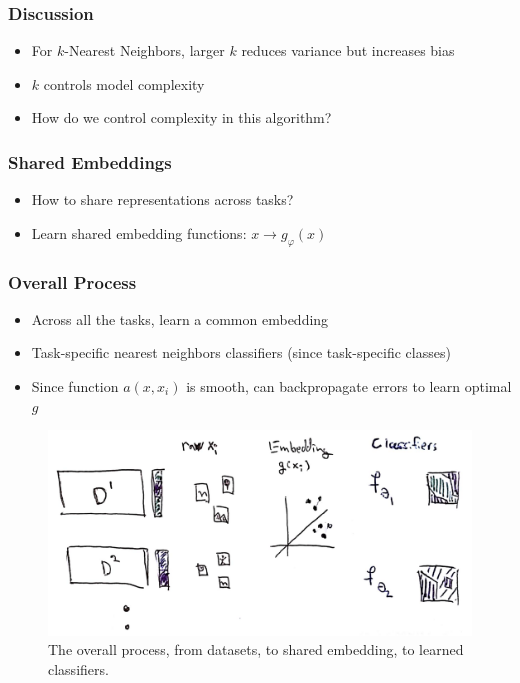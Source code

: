 \documentclass[10pt,mathserif]{beamer}
\begin{document}
\begin{frame}
  \frametitle{Discussion}
  \begin{itemize}
  \item For $k$-Nearest Neighbors, larger $k$ reduces variance but increases bias
  \item $k$ controls model complexity
  \item How do we control complexity in this algorithm?
  \end{itemize} 
\end{frame}

\begin{frame}
  \frametitle{Shared Embeddings}
 \begin{itemize}
 \item How to share representations across tasks? 
 \item Learn shared embedding functions: $x \rightarrow g_\varphi\left(x\right)$
 \end{itemize} 
\end{frame}

\begin{frame}
  \frametitle{Overall Process}
 \begin{itemize}
 \item  Across all the tasks, learn a common embedding
 \item Task-specific nearest neighbors classifiers (since task-specific classes)
 \item Since function $a\left(x, x_i\right)$ is smooth, can backpropagate errors
   to learn optimal $g$
 \end{itemize} 
\begin{figure}[ht]
  \centering
  \includegraphics[width=0.7\paperwidth]{figure/nn_full_process}
  \caption{The overall process, from datasets, to shared embedding, to learned
    classifiers. \label{fig:nn_full_process} }
\end{figure}
\end{frame}
\end{document}
